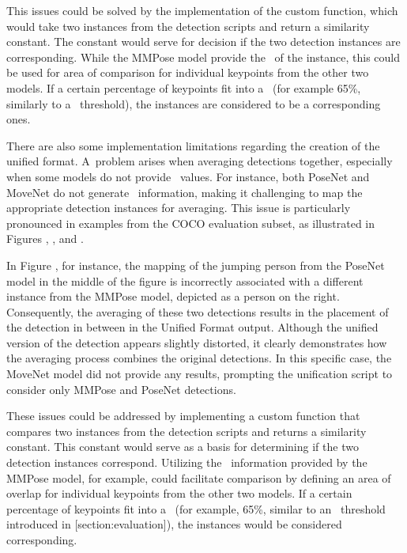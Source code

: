 This issues could be solved by the implementation of the custom function, which would take two instances from the detection scripts and return a similarity constant. The constant would serve for decision if the two detection instances are corresponding. While the MMPose model provide the \BBOX\ of the instance, this could be used for area of comparison for individual keypoints from the other two models. If a certain percentage of keypoints fit into a \BBOX\ (for example 65\%, similarly to a \IoU\ threshold), the instances are considered to be a corresponding ones.

There are also some implementation limitations regarding the creation of the unified format. A~problem arises when averaging detections together, especially when some models do not provide \BBOX\ values. For instance, both PoseNet and MoveNet do not generate \BBOX\ information, making it challenging to map the appropriate detection instances for averaging. This issue is particularly pronounced in examples from the COCO evaluation subset, as illustrated in Figures , , and .

In Figure , for instance, the mapping of the jumping person from the PoseNet model in the middle of the figure is incorrectly associated with a different instance from the MMPose model, depicted as a person on the right. Consequently, the averaging of these two detections results in the placement of the detection in between in the Unified Format output. Although the unified version of the detection appears slightly distorted, it clearly demonstrates how the averaging process combines the original detections. In this specific case, the MoveNet model did not provide any results, prompting the unification script to consider only MMPose and PoseNet detections.

These issues could be addressed by implementing a custom function that compares two instances from the detection scripts and returns a similarity constant. This constant would serve as a basis for determining if the two detection instances correspond. Utilizing the \BBOX\ information provided by the MMPose model, for example, could facilitate comparison by defining an area of overlap for individual keypoints from the other two models. If a certain percentage of keypoints fit into a \BBOX\ (for example, 65\%, similar to an \IoU\ threshold introduced in [section:evaluation]), the instances would be considered corresponding.
